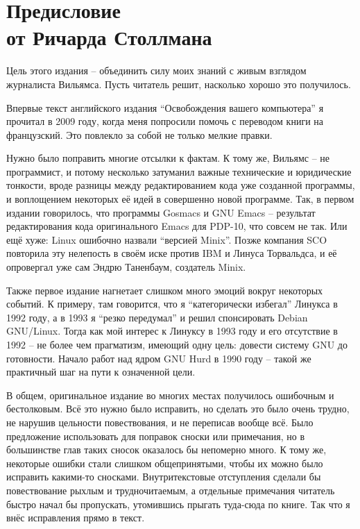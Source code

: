 
\chapter[Предисловие от Ричарда Столлмана]{Предисловие\\от Ричарда Столлмана}

Цель этого издания -- объединить силу моих знаний с живым взглядом журналиста Вильямса. Пусть читатель решит, насколько хорошо это получилось.

Впервые текст английского издания ``Освобождения вашего компьютера'' я прочитал в 2009 году, когда меня попросили помочь с переводом книги на французский. Это повлекло за собой не только мелкие правки.

Нужно было поправить многие отсылки к фактам. К тому же, Вильямс -- не программист, и потому несколько затуманил важные технические и юридические тонкости, вроде разницы между редактированием кода уже созданной программы, и воплощением некоторых её идей в совершенно новой программе. Так, в первом издании говорилось, что программы Gosmacs и GNU Emacs -- результат редактирования кода оригинального Emacs для PDP-10, что совсем не так. Или ещё хуже: Linux ошибочно назвали ``версией Minix''. Позже компания SCO повторила эту нелепость в своём иске против IBM и Линуса Торвальдса, и её опровергал уже сам Эндрю Таненбаум, создатель Minix.

Также первое издание нагнетает слишком много эмоций вокруг некоторых событий. К примеру, там говорится, что я ``категорически избегал'' Линукса в 1992 году, а в 1993 я ``резко передумал'' и решил спонсировать Debian GNU/Linux. Тогда как мой интерес к Линуксу в 1993 году и его отсутствие в 1992 -- не более чем прагматизм, имеющий одну цель: довести систему GNU до готовности. Начало работ над ядром GNU Hurd в 1990 году -- такой же практичный шаг на пути к означенной цели.

В общем, оригинальное издание во многих местах получилось ошибочным и бестолковым. Всё это нужно было исправить, но сделать это было очень трудно, не нарушив цельности повествования, и не переписав вообще всё. Было предложение использовать для поправок сноски или примечания, но в большинстве глав таких сносок оказалось бы непомерно много. К тому же, некоторые ошибки стали слишком общепринятыми, чтобы их можно было исправить какими-то сносками. Внутритекстовые отступления сделали бы повествование рыхлым и трудночитаемым, а отдельные примечания читатель быстро начал бы пропускать, утомившись прыгать туда-сюда по книге. Так что я внёс исправления прямо в текст.

